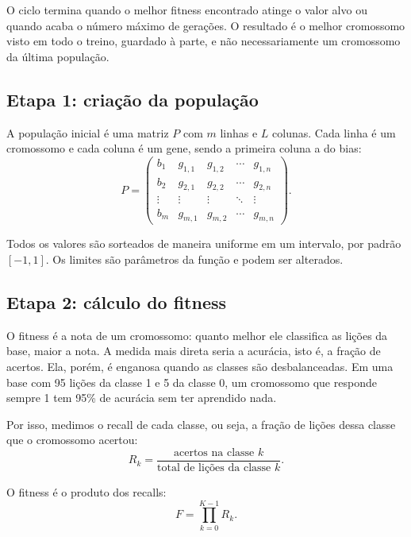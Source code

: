 \documentclass[11pt,a4paper]{article}
\begin{document}
\medskip
O ciclo termina quando o melhor fitness encontrado atinge o valor alvo ou quando acaba
o número máximo de gerações. O resultado é o melhor cromossomo visto em todo o treino,
guardado à parte, e não necessariamente um cromossomo da última população.

\subsection*{Etapa 1: criação da população}

A população inicial é uma matriz $P$ com $m$ linhas e $L$ colunas. Cada linha é um
cromossomo e cada coluna é um gene, sendo a primeira coluna a do bias:
\begin{equation}
  P =
  \begin{pmatrix}
    b_1    & g_{1,1} & g_{1,2} & \cdots & g_{1,n} \\
    b_2    & g_{2,1} & g_{2,2} & \cdots & g_{2,n} \\
    \vdots & \vdots  & \vdots  & \ddots & \vdots  \\
    b_m    & g_{m,1} & g_{m,2} & \cdots & g_{m,n}
  \end{pmatrix}.
\end{equation}

Todos os valores são sorteados de maneira uniforme em um intervalo, por padrão
$[-1, 1]$. Os limites são parâmetros da função e podem ser alterados.

\subsection*{Etapa 2: cálculo do fitness}

O fitness é a nota de um cromossomo: quanto melhor ele classifica as lições da base,
maior a nota. A medida mais direta seria a acurácia, isto é, a fração de acertos. Ela,
porém, é enganosa quando as classes são desbalanceadas. Em uma base com 95 lições da
classe 1 e 5 da classe 0, um cromossomo que responde sempre 1 tem 95\% de acurácia sem
ter aprendido nada.

Por isso, medimos o recall de cada classe, ou seja, a fração de lições dessa classe que
o cromossomo acertou:
\begin{equation}
  R_k = \frac{\text{acertos na classe } k}{\text{total de lições da classe } k}.
\end{equation}

O fitness é o produto dos recalls:
\begin{equation}
  F = \prod_{k=0}^{K-1} R_k.
  \label{eq:fitness}
\end{equation}
\end{document}
